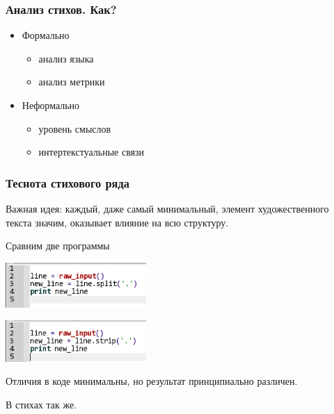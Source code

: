 \documentclass{beamer}
\begin{document}

\begin{frame}
\frametitle{Анализ стихов. Как?}


\begin{itemize}
\item Формально
\begin{itemize}
\item анализ языка
\item анализ метрики
\end{itemize} 
\item Неформально
\begin{itemize}
\item уровень смыслов
\item интертекстуальные связи
\end{itemize} 
\end{itemize}

\end{frame}


\begin{frame}
\frametitle{Теснота стихового ряда}

Важная идея: каждый, даже самый минимальный, элемент художественного текста значим, оказывает влияние на всю структуру.

Сравним две программы

\begin{center}
\includegraphics[width=0.4\textwidth]{code1.png}
\end{center}

\begin{center}
\includegraphics[width=0.4\textwidth]{code2.png}
\end{center}

Отличия в коде минимальны, но результат принципиально различен.

В стихах так же.

\end{frame}


\end{document}
